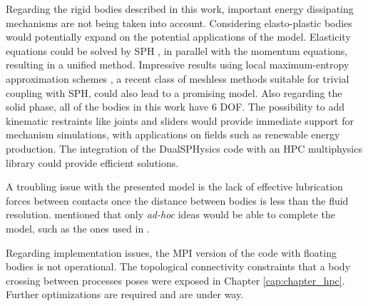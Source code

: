 Regarding the rigid bodies described in this work, important energy dissipating mechanisms are not being taken into account. Considering elasto-plastic bodies would potentially expand on the potential applications of the model. Elasticity equations could be solved by SPH \citep{Cleary-2008}, in parallel with the momentum equations, resulting in a unified method. Impressive results using local maximum-entropy approximation schemes \citep{Arroyo-2006, Ortiz-2010}, a recent class of meshless methods suitable for trivial coupling with SPH, could also lead to a promising model. Also regarding the solid phase, all of the bodies in this work have 6 \ac{DOF}.
The possibility to add kinematic restraints like joints and sliders would provide immediate support for mechanism simulations, with applications on fields such as renewable energy production. The integration of the DualSPHysics code with an \ac{HPC} multiphysics library could provide efficient solutions.

A troubling issue with the presented model is the lack of effective lubrication forces between contacts once the distance between bodies is less than the fluid resolution. \cite{Potapov-2001} mentioned that only \textit{ad-hoc} ideas would be able to complete the model, such as the ones used in \cite{Kempe-2012}.

Regarding implementation issues, the MPI version of the code with floating bodies is not operational. The topological connectivity constraints that a body crossing between processes poses were exposed in Chapter \ref{cap:chapter_hpc}. Further optimizations are required and are under way.

\cleardoublepage
